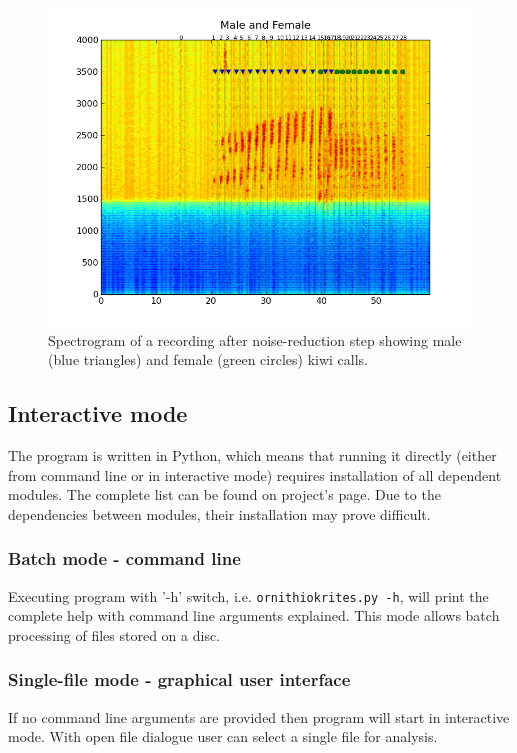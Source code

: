 \documentclass[paper=a4, fontsize=11pt]{scrartcl}	%
\numberwithin{equation}{section}		%
\numberwithin{figure}{section}			%
\numberwithin{table}{section}				%
\begin{document}
\begin{figure}[hbtp]
\label{fig:spectrogram}
\caption{Spectrogram of a recording after noise-reduction step showing male (blue triangles) and female (green circles) kiwi calls. }
\centering
\includegraphics[scale=0.7]{spectrogram.png}
\end{figure}


\subsection{Interactive mode}
\label{sec:interactive_mode}
The program is written in Python, which means that running it directly (either from command line or in interactive mode) requires installation of all dependent modules. The complete list can be found on project's page. Due to the dependencies between modules, their installation may prove difficult.
\subsubsection{Batch mode - command line}
Executing program with '-h' switch, i.e. \texttt{ornithiokrites.py -h}, will print the complete help with command line arguments explained. This mode allows batch processing of files stored on a disc.
\subsubsection{Single-file mode - graphical user interface}
If no command line arguments are provided then program will start in interactive mode. With open file dialogue user can select a single file for analysis.
\end{document}
